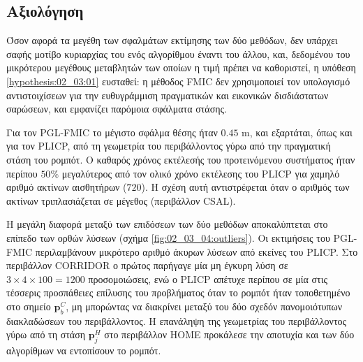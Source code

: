 \subsection{Αξιολόγηση}
\label{subsection:02_03_04:03}

Όσον αφορά τα μεγέθη των σφαλμάτων εκτίμησης των δύο μεθόδων, δεν υπάρχει σαφής
μοτίβο κυριαρχίας του ενός αλγορίθμου έναντι του άλλου, και, δεδομένου του
μικρότερου μεγέθους μεταβλητών των οποίων η τιμή πρέπει να καθοριστεί, η
υπόθεση \ref{hypothesis:02_03:01} ευσταθεί: η μέθοδος FMIC δεν χρησιμοποιεί
τον υπολογισμό αντιστοιχίσεων για την ευθυγράμμιση πραγματικών και εικονικών
δισδιάστατων σαρώσεων, και εμφανίζει παρόμοια σφάλματα στάσης.

Για τον PGL-FMIC το μέγιστο σφάλμα θέσης ήταν $0.45$ m, και εξαρτάται, όπως και
για τον PLICP, από τη γεωμετρία του περιβάλλοντος γύρω από την πραγματική στάση
του ρομπότ.  Ο καθαρός χρόνος εκτέλεσής του προτεινόμενου συστήματος ήταν
περίπου $50\%$ μεγαλύτερος από τον ολικό χρόνο εκτέλεσης του PLICP για χαμηλό
αριθμό ακτίνων αισθητήρων ($720$). H σχέση αυτή αντιστρέφεται όταν ο αριθμός
των ακτίνων τριπλασιάζεται σε μέγεθος (περιβάλλον CSAL).

Η μεγάλη διαφορά μεταξύ των επιδόσεων των δύο μεθόδων αποκαλύπτεται στο επίπεδο
των ορθών λύσεων (σχήμα \ref{fig:02_03_04:outliers}). Οι εκτιμήσεις του
PGL-FMIC περιλαμβάνουν μικρότερο αριθμό άκυρων λύσεων από εκείνες του PLICP.
Στο περιβάλλον CORRIDOR ο πρώτος παρήγαγε μία μη έγκυρη λύση σε
$3\times4\times100 = 1200$  προσομοιώσεις, ενώ ο PLICP απέτυχε περίπου σε μία
στις τέσσερις προσπάθειες επίλυσης του προβλήματος όταν το ρομπότ ήταν
τοποθετημένο στο σημείο $\bm{p}_b^C$, μη μπορώντας να διακρίνει μεταξύ του δύο
σχεδόν πανομοιότυπων διακλαδώσεων του περιβάλλοντος. Η επανάληψη της γεωμετρίας
του περιβάλλοντος γύρω από τη στάση $\bm{p}_j^H$ στο περιβάλλον HOME προκάλεσε
την αποτυχία και των δύο αλγορίθμων να εντοπίσουν το ρομπότ.

